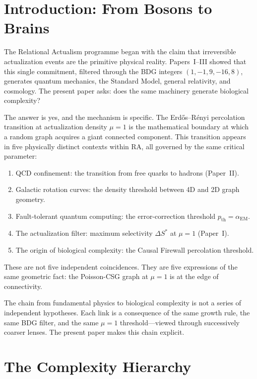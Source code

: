 \documentclass[11pt]{article}
\begin{document}
\section{Introduction: From Bosons to Brains}

The Relational Actualism programme began with the claim that irreversible actualization events are the primitive physical reality. Papers~I--III showed that this single commitment, filtered through the BDG integers $(1,-1,9,-16,8)$, generates quantum mechanics, the Standard Model, general relativity, and cosmology. The present paper asks: does the same machinery generate biological complexity?

The answer is yes, and the mechanism is specific. The Erd\H{o}s--R\'enyi percolation transition at actualization density $\mu=1$ is the mathematical boundary at which a random graph acquires a giant connected component. This transition appears in five physically distinct contexts within RA, all governed by the same critical parameter:
\begin{enumerate}[nosep]
\item QCD confinement: the transition from free quarks to hadrons (Paper~II).
\item Galactic rotation curves: the density threshold between 4D and 2D graph geometry.
\item Fault-tolerant quantum computing: the error-correction threshold $p_{\mathrm{th}}=\alpha_{\mathrm{EM}}$.
\item The actualization filter: maximum selectivity $\Delta S^*$ at $\mu=1$ (Paper~I).
\item The origin of biological complexity: the Causal Firewall percolation threshold.
\end{enumerate}

These are not five independent coincidences. They are five expressions of the same geometric fact: the Poisson-CSG graph at $\mu=1$ is at the edge of connectivity.

The chain from fundamental physics to biological complexity is not a series of independent hypotheses. Each link is a consequence of the same growth rule, the same BDG filter, and the same $\mu=1$ threshold---viewed through successively coarser lenses. The present paper makes this chain explicit.

\section{The Complexity Hierarchy}
\label{sec:hierarchy}
\end{document}
